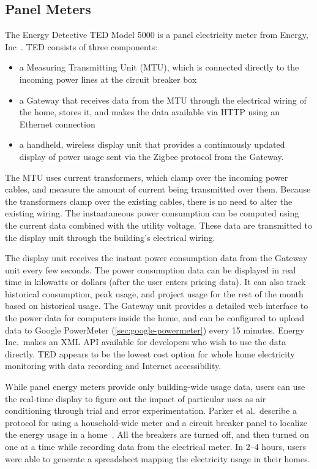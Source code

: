 \subsection{Panel Meters}
\label{sec:panel-meters}

The Energy Detective TED Model 5000 is a panel electricity meter from Energy, Inc~\cite{the-energy-detective}. TED consists of three components:

\begin{itemize}
	\item a Measuring Transmitting Unit (MTU), which is connected directly to the incoming power lines at the circuit breaker box
	\item a Gateway that receives data from the MTU through the electrical wiring of the home, stores it, and makes the data available via HTTP using an Ethernet connection
	\item a handheld, wireless display unit that provides a continuously updated display of power usage sent via the Zigbee protocol from the Gateway.
\end{itemize}

The MTU uses current transformers, which clamp over the incoming power cables, and measure the amount of current being transmitted over them. Because the transformers clamp over the existing cables, there is no need to alter the existing wiring. The instantaneous power consumption can be computed using the current data combined with the utility voltage. These data are transmitted to the display unit through the building's electrical wiring.

The display unit receives the instant power consumption data from the Gateway unit every few seconds. The power consumption data can be displayed in real time in kilowatts or dollars (after the user enters pricing data). It can also track historical consumption, peak usage, and project usage for the rest of the month based on historical usage. The Gateway unit provides a detailed web interface to the power data for computers inside the home, and can be configured to upload data to Google PowerMeter (\autoref{sec:google-powermeter}) every 15 minutes. Energy Inc.\ makes an XML API available for developers who wish to use the data directly. TED appears to be the lowest cost option for whole home electricity monitoring with data recording and Internet accessibility.

While panel energy meters provide only building-wide usage data, users can use the real-time display to figure out the impact of particular uses as air conditioning through trial and error experimentation. Parker et al.\ describe a protocol for using a household-wide meter and a circuit breaker panel to localize the energy usage in a home~\cite{Parker2006How-Much-Energy}. All the breakers are turned off, and then turned on one at a time while recording data from the electrical meter. In 2--4 hours, users were able to generate a spreadsheet mapping the electricity usage in their homes.

